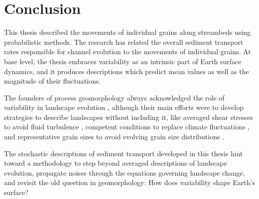\section{Conclusion}

This thesis described the movements of individual grains along streambeds using probabilistic methods.
The research has related the overall sediment transport rates responsible for channel evolution to the movements of individual grains.
At base level, the thesis embraces variability as an intrinsic part of Earth surface dynamics, and it produces descriptions which predict mean values as well as the magnitude of their fluctuations.

The founders of process geomorphology always acknowledged the role of variability in landscape evolution \citep{Horton1945,Strahler1952,Langbein1964}, although their main efforts were to develop strategies to describe landscapes without including it, like averaged shear stresses to avoid fluid turbulence \citep{MeyerPeter1948,Bagnold1954}, competent conditions to replace climate fluctuations \citep{Wolman1959,Wolman1978}, and representative grain sizes to avoid evolving grain size distributions \citep{Parker1982,Andrews1983}.

The stochastic descriptions of sediment transport developed in this thesis hint toward a methodology to step beyond averaged descriptions of landscape evolution, propagate noises through the equations governing landscape change, and revisit the old question in geomorphology: How does variability shape Earth's surface?

